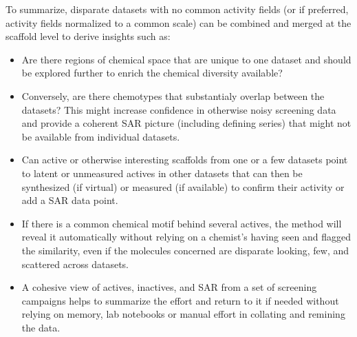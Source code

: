\documentclass[journal=jacsat,manuscript=article]{achemso}
\begin{document}
To summarize, disparate datasets with no common activity fields (or if preferred, activity fields normalized to a common scale) can be combined and merged at the scaffold level to derive insights such as:
\begin{itemize}
\item Are there regions of chemical space that are unique to one dataset and should be explored further to enrich the chemical diversity available?
\item Conversely, are there chemotypes that substantialy overlap between the datasets?  This might increase confidence in otherwise noisy screening data and provide a coherent SAR picture (including defining series) that might not be available from individual datasets.
\item Can active or otherwise interesting scaffolds from one or a few datasets point to latent or unmeasured actives in other datasets that can then be synthesized (if virtual) or measured (if available) to confirm their activity or add a SAR data point. 
\item If there is a common chemical motif behind several actives, the method will reveal it automatically without relying on a chemist's having seen and flagged the similarity, even if the molecules concerned are disparate looking, few, and scattered across datasets.
\item A cohesive view of actives, inactives, and SAR from a set of screening campaigns helps to summarize the effort and return to it if needed without relying on memory, lab notebooks or manual effort in collating and remining the data.   
\end{itemize} 
\end{document}
